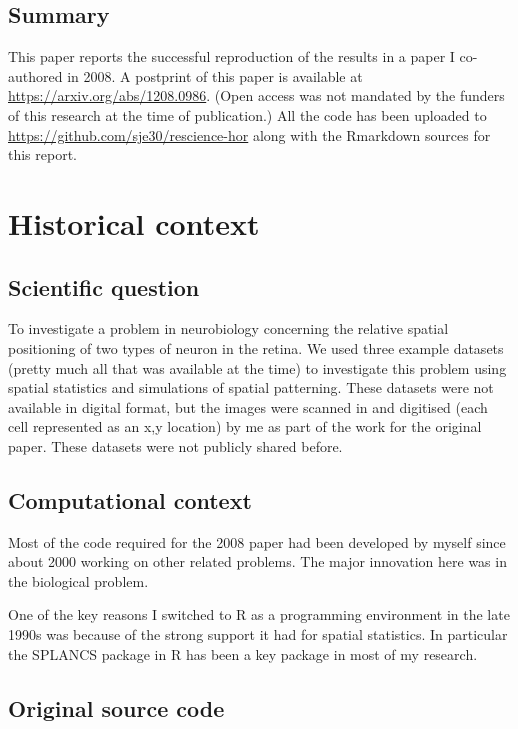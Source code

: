 
\subsection{Summary}

This paper reports the successful reproduction of the results in a
paper I co-authored in 2008\supercite{Eglen2008-ca}. A postprint of
this paper is available at
\url{https://arxiv.org/abs/1208.0986}. (Open access was not mandated
by the funders of this research at the time of publication.) All the
code has been uploaded to \url{https://github.com/sje30/rescience-hor}
along with the Rmarkdown sources for this report.

\section{Historical context}


\subsection{Scientific question}

To investigate a problem in neurobiology concerning the relative spatial
positioning of two types of neuron in the retina. We used three example
datasets (pretty much all that was available at the time) to investigate
this problem using spatial statistics and simulations of spatial
patterning. These datasets were not available in digital format, but the
images\supercite{Wassle1978-cd,Wassle2000-aa} were
scanned in and digitised (each cell represented as an x,y location) by
me as part of the work for the original paper. These datasets were not
publicly shared before.

\subsection{Computational context}

Most of the code required for the 2008 paper had been developed by
myself since about 2000 working on other related problems. The major
innovation here was in the biological problem.

One of the key reasons I switched to R as a programming environment in
the late 1990s was because of the strong support it had for spatial
statistics. In particular the SPLANCS
package\supercite{splancs} in R has been a key package in most of my research.

\subsection{Original source code}

